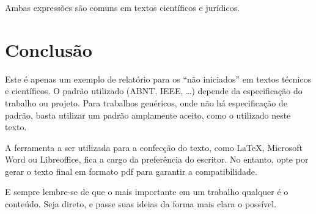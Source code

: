 \documentclass[conference]{IEEEtran}
\begin{document}
Ambas expressões são comuns em textos científicos e jurídicos.

\section{Conclusão}

Este é apenas um exemplo de relatório para os ``não iniciados'' em textos técnicos e científicos. O padrão utilizado (\ac{ABNT}, \ac{IEEE}, \dots) depende da especificação do trabalho ou projeto. Para trabalhos genéricos, onde não há especificação de padrão, basta utilizar um padrão amplamente aceito, como o utilizado neste texto.

A ferramenta a ser utilizada para a confecção do texto, como \LaTeX, Microsoft Word ou Libreoffice, fica a cargo da preferência do escritor. No entanto, opte por gerar o texto final em formato pdf para garantir a compatibilidade.

E sempre lembre-se de que o mais importante em um trabalho qualquer é o conteúdo. Seja direto, e passe suas ideias da forma mais clara o possível.



\end{document}
